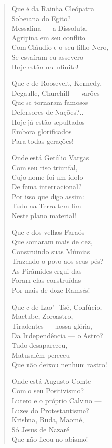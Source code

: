 \begin{verse}
Que é da Rainha Cleópatra \\
Soberana do Egito? \\
Messalina ---  a Dissoluta, \\
Agripina em seu conflito \\
Com Cláudio e o seu filho Nero, \\
Se esvaíram eu assevero, \\
Hoje estão no infinito! 


Que é de Roosevelt, Kennedy, \\
Degaulle, Churchill ---  varões \\
Que se tornaram famosos --- \\
Defensores de Nações?... \\
Hoje já estão sepultados \\
Embora glorificados \\
Para todas gerações! 

Onde está Getúlio Vargas \\
Com seu riso triunfal, \\
Cujo nome foi um ídolo \\
De fama internacional? \\
Por isso que digo assim: \\
Tudo na Terra tem fim \\
Neste plano material! 

Que é dos velhos Faraós \\
Que somaram mais de dez, \\
Construindo suas Múmias \\
Trazendo o povo aos seus pés? \\
As Pirâmides ergui das \\
Foram elas construídas \\
Por mais de doze Ramsés! 

Que é de Lao"- Tsé, Confúcio, \\
Mactube, Zoroastro, \\
Tiradentes ---  nossa glória, \\
Da Independência ---  o Astro? \\
Tudo desapareceu, \\
Matusalém pereceu \\
Que não deixou nenhum rastro! 


Onde está Augusto Comte \\
Com o seu Positivismo? \\
Lutero e o próprio Calvino  ---\\
Luzes do Protestantismo? \\
Krishna, Buda, Maomé, \\
Só Jesus de Nazaré \\
Que não ficou no abismo! 


\end{verse}
